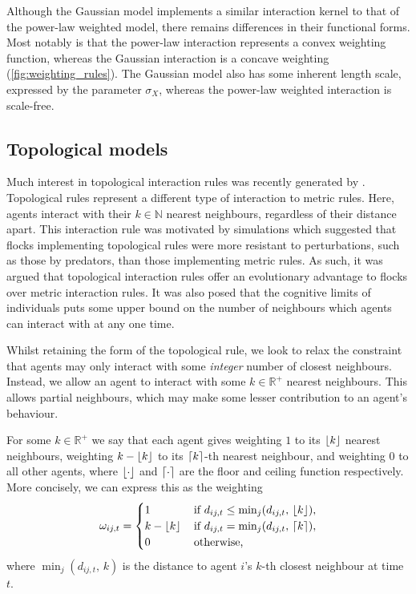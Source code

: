 Although the Gaussian model implements a similar interaction kernel to that of the
power-law weighted model, there remains differences in their functional forms.  Most
notably is that the power-law interaction represents a convex weighting function, whereas
the Gaussian interaction is a concave weighting (\cref{fig:weighting_rules}). The Gaussian
model also has some inherent length scale, expressed by the parameter $\sigma_X$, whereas
the power-law weighted interaction is scale-free.

\subsection{Topological models}

Much interest in topological interaction rules was recently generated by
\cite{ballerini08}. Topological rules represent a different type of interaction to metric
rules. Here, agents interact with their $k\in\mathbb{N}$ nearest neighbours, regardless of
their distance apart. This interaction rule was motivated by simulations which suggested
that flocks implementing topological rules were more resistant to perturbations, such as
those by predators, than those implementing metric rules. As such, it was argued that
topological interaction rules offer an evolutionary advantage to flocks over metric
interaction rules.
It was also posed that the cognitive limits of individuals puts some upper bound on the
number of neighbours which agents can interact with at any one time.

Whilst retaining the form of the topological rule, we look to relax the constraint that
agents may only interact with some \emph{integer} number of closest neighbours.  Instead,
we allow an agent to interact with some $k\in\mathbb{R}^+$ nearest neighbours.  This
allows partial neighbours, which may make some lesser contribution to an agent's behaviour.

For some $k\in\mathbb{R}^+$ we say that each agent gives weighting $1$ to its $\lfloor k\rfloor$
nearest neighbours, weighting $k - \lfloor k\rfloor$ to its $\lceil k\rceil$-th nearest neighbour, and
weighting $0$ to all other agents, where $\lfloor\cdot\rfloor$ and $\lceil\cdot\rceil$ are the floor
and ceiling function respectively. More concisely, we can express this as the weighting
\begin{equation}
	\omega_{ij,t} =
	\begin{cases}
		1           & \, \text{if } d_{ij, t} \leq \min_j(d_{ij,t},\, \lfloor k\rfloor), \\
		k-\lfloor k\rfloor & \, \text{if } d_{ij, t} = \min_j(d_{ij,t},\, \lceil k\rceil),     \\
		0           & \, \text{otherwise,}
	\end{cases}
\end{equation}
where $\min_j(d_{ij,t},\, k)$ is the distance to agent $i$'s $k$-th closest neighbour at
time $t$. 

